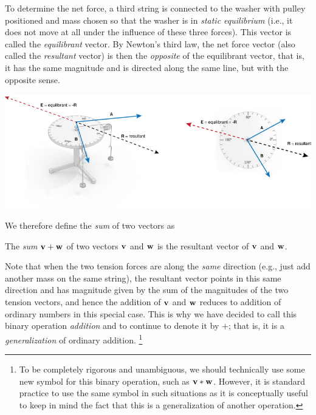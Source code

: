 \documentclass[12pt,letterpaper,reqno]{article}
\numberwithin{equation}{section}
\newcommand{\ti}[1]{\textit{#1}}
\begin{document}
To determine the net force, a third string is connected to the washer with pulley positioned and mass chosen so that the washer is in \ti{static equilibrium} (i.e., it does not move at all under the influence of these three forces). This vector is called the \ti{equilibrant} vector. By Newton's third law, the net force vector (also called the \ti{resultant} vector) is then the \ti{opposite} of the equilibrant vector, that is, it has the same magnitude and is directed along the same line, but with the opposite sense.

\begin{center}
	\includegraphics[scale=0.5]{figures_mvc/force-table-equi-res}
\end{center}

 We therefore define the \ti{sum} of two vectors as  
 
 \begin{defn}
 	The \ti{sum} ${\bf v}+{\bf w}$ of two vectors ${\bf v}$ and ${\bf w}$ is the resultant vector of ${\bf v}$ and ${\bf w}$.
 \end{defn}
Note that when the two tension forces are along the \ti{same} direction (e.g., just add another mass on the same string), the resultant vector points in this same direction and has magnitude given by the sum of the magnitudes of the two tension vectors, and hence the addition of ${\bf v}$ and ${\bf w}$ reduces to addition of ordinary numbers in this special case. This is why we have decided to call this binary operation \ti{addition} and to continue to denote it by $+$; that is, it is a \ti{generalization} of ordinary addition. \footnote{To be completely rigorous and unambiguous, we should technically use some new symbol for this binary operation, such as ${\bf v}*{\bf w}$. However, it is standard practice to use the same symbol in such situations as it is conceptually useful to keep in mind the fact that this is a generalization of another operation.}
 
\end{document}
